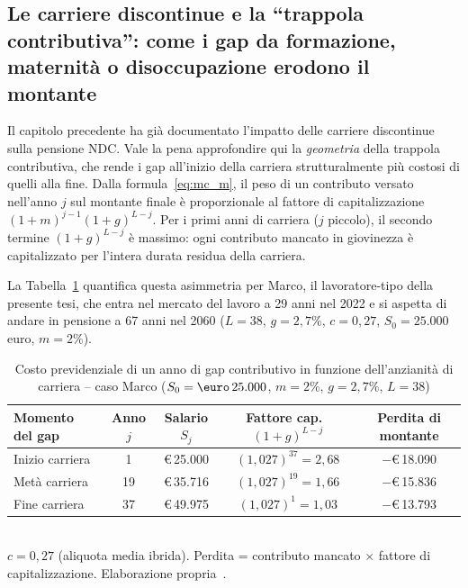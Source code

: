 \subsection{Le carriere discontinue e la ``trappola contributiva'':
            come i gap da formazione, maternità o disoccupazione
            erodono il montante}
\label{subsec:trappola_contributiva}

Il capitolo precedente ha già documentato l'impatto delle carriere
discontinue sulla pensione NDC. Vale la pena approfondire qui la
\emph{geometria} della trappola contributiva, che rende i gap all'inizio
della carriera strutturalmente più costosi di quelli alla fine. Dalla
formula~\eqref{eq:mc_m}, il peso di un contributo versato nell'anno \(j\)
sul montante finale è proporzionale al fattore di capitalizzazione
\((1+m)^{j-1}(1+g)^{L-j}\). Per i primi anni di carriera (\(j\) piccolo),
il secondo termine \((1+g)^{L-j}\) è massimo: ogni contributo mancato
in giovinezza è capitalizzato per l'intera durata residua della carriera.

La Tabella~\ref{tab:trappola} quantifica questa asimmetria per Marco,
il lavoratore-tipo della presente tesi, che entra nel mercato del lavoro
a 29 anni nel 2022 e si aspetta di andare in pensione a 67 anni nel 2060
(\(L = 38\), \(g = 2{,}7\%\), \(c = 0{,}27\), \(S_0 = 25.000\) euro,
\(m = 2\%\)).

\begin{table}[htbp]
\centering
\caption{Costo previdenziale di un anno di gap contributivo
         in funzione dell'anzianità di carriera -- caso Marco
         (\(S_0=\text{\euro}\,25.000\), \(m=2\%\), \(g=2{,}7\%\), \(L=38\))}
\label{tab:trappola}
\begin{tabular}{lcccc}
\toprule
Momento del gap & Anno \(j\) &
  Salario \(S_j\) & Fattore cap.\ \((1+g)^{L-j}\) &
  Perdita di montante \\
\midrule
Inizio carriera  & 1  & \euro\,25.000 & $(1{,}027)^{37} = 2{,}68$ &
  $-$\euro\,18.090 \\
Metà carriera    & 19 & \euro\,35.716 & $(1{,}027)^{19} = 1{,}66$ &
  $-$\euro\,15.836 \\
Fine carriera    & 37 & \euro\,49.975 & $(1{,}027)^{1}  = 1{,}03$ &
  $-$\euro\,13.793 \\
\bottomrule
\end{tabular}
\smallskip\\
\footnotesize \(c = 0{,}27\) (aliquota media ibrida). Perdita = contributo
mancato \(\times\) fattore di capitalizzazione.
Elaborazione propria~\cite{Bosi2018, MEFRGS2025}.
\end{table}

